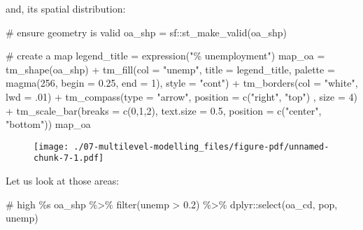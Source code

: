 \documentclass[
  letterpaper,
  krantz2]{style/krantz}
\newenvironment{Shaded}{\begin{snugshade}}{\end{snugshade}}
\newcommand{\AttributeTok}[1]{\textcolor[rgb]{0.40,0.45,0.13}{#1}}
\newcommand{\CommentTok}[1]{\textcolor[rgb]{0.37,0.37,0.37}{#1}}
\newcommand{\DecValTok}[1]{\textcolor[rgb]{0.68,0.00,0.00}{#1}}
\newcommand{\FloatTok}[1]{\textcolor[rgb]{0.68,0.00,0.00}{#1}}
\newcommand{\FunctionTok}[1]{\textcolor[rgb]{0.28,0.35,0.67}{#1}}
\newcommand{\NormalTok}[1]{\textcolor[rgb]{0.00,0.23,0.31}{#1}}
\newcommand{\OtherTok}[1]{\textcolor[rgb]{0.00,0.23,0.31}{#1}}
\newcommand{\SpecialCharTok}[1]{\textcolor[rgb]{0.37,0.37,0.37}{#1}}
\newcommand{\StringTok}[1]{\textcolor[rgb]{0.13,0.47,0.30}{#1}}
\begin{document}
and, its spatial distribution:

\begin{Shaded}
\begin{Highlighting}[]
\CommentTok{\# ensure geometry is valid}
\NormalTok{oa\_shp }\OtherTok{=}\NormalTok{ sf}\SpecialCharTok{::}\FunctionTok{st\_make\_valid}\NormalTok{(oa\_shp)}

\CommentTok{\# create a map}
\NormalTok{legend\_title }\OtherTok{=} \FunctionTok{expression}\NormalTok{(}\StringTok{"\% unemployment"}\NormalTok{)}
\NormalTok{map\_oa }\OtherTok{=} \FunctionTok{tm\_shape}\NormalTok{(oa\_shp) }\SpecialCharTok{+}
  \FunctionTok{tm\_fill}\NormalTok{(}\AttributeTok{col =} \StringTok{"unemp"}\NormalTok{, }\AttributeTok{title =}\NormalTok{ legend\_title, }\AttributeTok{palette =} \FunctionTok{magma}\NormalTok{(}\DecValTok{256}\NormalTok{, }\AttributeTok{begin =} \FloatTok{0.25}\NormalTok{, }\AttributeTok{end =} \DecValTok{1}\NormalTok{), }\AttributeTok{style =} \StringTok{"cont"}\NormalTok{) }\SpecialCharTok{+} 
  \FunctionTok{tm\_borders}\NormalTok{(}\AttributeTok{col =} \StringTok{"white"}\NormalTok{, }\AttributeTok{lwd =}\NormalTok{ .}\DecValTok{01}\NormalTok{)  }\SpecialCharTok{+} 
  \FunctionTok{tm\_compass}\NormalTok{(}\AttributeTok{type =} \StringTok{"arrow"}\NormalTok{, }\AttributeTok{position =} \FunctionTok{c}\NormalTok{(}\StringTok{"right"}\NormalTok{, }\StringTok{"top"}\NormalTok{) , }\AttributeTok{size =} \DecValTok{4}\NormalTok{) }\SpecialCharTok{+} 
  \FunctionTok{tm\_scale\_bar}\NormalTok{(}\AttributeTok{breaks =} \FunctionTok{c}\NormalTok{(}\DecValTok{0}\NormalTok{,}\DecValTok{1}\NormalTok{,}\DecValTok{2}\NormalTok{), }\AttributeTok{text.size =} \FloatTok{0.5}\NormalTok{, }\AttributeTok{position =}  \FunctionTok{c}\NormalTok{(}\StringTok{"center"}\NormalTok{, }\StringTok{"bottom"}\NormalTok{)) }
\NormalTok{map\_oa}
\end{Highlighting}
\end{Shaded}

\begin{figure}[H]

{\centering \texttt{[image: ./07-multilevel-modelling\_files/figure-pdf/unnamed-chunk-7-1.pdf]}

}

\end{figure}

Let us look at those areas:

\begin{Shaded}
\begin{Highlighting}[]
\CommentTok{\# high \%s}
\NormalTok{oa\_shp }\SpecialCharTok{\%\textgreater{}\%} \FunctionTok{filter}\NormalTok{(unemp }\SpecialCharTok{\textgreater{}} \FloatTok{0.2}\NormalTok{) }\SpecialCharTok{\%\textgreater{}\%} 
\NormalTok{  dplyr}\SpecialCharTok{::}\FunctionTok{select}\NormalTok{(oa\_cd, pop, unemp) }
\end{Highlighting}
\end{Shaded}
\end{document}
